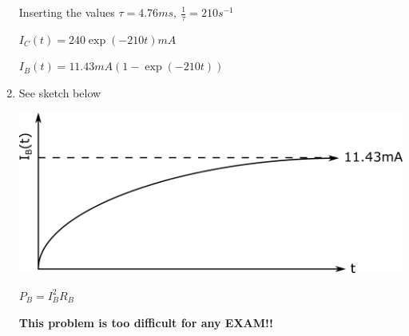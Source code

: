 \begin{enumerate}
	Inserting the values $\tau=4.76ms, \: \frac{1}{\tau}=210s^{-1}$
	\vspace{5mm}
	
	$I_C(t)=240\exp(-210t)mA$
	
	$I_B(t)=11.43mA(1-\exp(-210t))$
	
	\item See sketch below
	
	\vspace{5mm}
	\includegraphics[width=0.7\linewidth]{Images/P9img3.png}
	
	
	$P_B=I_B^2R_B$
	
	\vspace{5mm}
	\textbf{\large This problem is too difficult for any EXAM!!}
\end{enumerate}